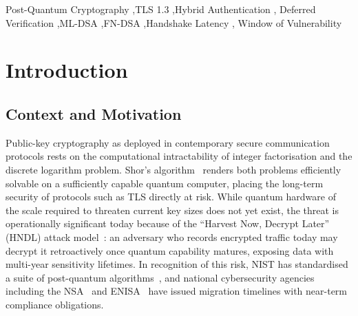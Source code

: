 \documentclass[preprint,10pt,3p]{elsarticle}
\newcommand{\Dt}{\ensuremath{\Delta t}}
\newcommand{\ms}{\,ms}
\begin{document}
\begin{frontmatter}
\begin{abstract}
Four contributions are made.  First, a proof-of-concept implementation is
presented within OpenSSL~3.x using the Open Quantum Safe (OQS) provider,
validated on both Windows~11 and Ubuntu~22.04 with AVX2-optimised PQC
primitives.  Second, controlled experiments across RTT values of 0--150\ms\ and
concurrency levels of 100--1000 clients establish that DAPV reduces
client-perceived handshake latency by a constant offset of approximately 20\ms,
independent of RTT, with server throughput improving by 30--36\% for hybrid
P-256\,+\,ML-DSA-44 at 500 concurrent clients.  Third, decomposition of the
Window of Vulnerability (\Dt) --- the interval between provisional handshake
completion and PQC confirmation --- reveals that the measured 14--21\ms\ window
is dominated by thread scheduling overhead rather than cryptographic
computation, which costs less than 0.15\ms\ on modern AVX2 hardware.  Fourth,
a quantitative risk characterisation provides leakage bounds across link speeds
and CPU load levels, identifies a novel denial-of-service vector specific to
deferred verification, and proposes concrete mitigations including a bounded
thread pool, a data-transmission cap, and a minimal OpenSSL API design for
application-layer policy enforcement.
\end{abstract}

\begin{keyword}
Post-Quantum Cryptography \sep TLS 1.3 \sep Hybrid Authentication \sep
Deferred Verification \sep ML-DSA \sep FN-DSA \sep Handshake Latency \sep
Window of Vulnerability
\end{keyword}
\end{frontmatter}

\section{Introduction}
\label{sec:intro}

\subsection{Context and Motivation}

Public-key cryptography as deployed in contemporary secure communication
protocols rests on the computational intractability of integer factorisation and
the discrete logarithm problem.  Shor's algorithm~\cite{Shor1994} renders both
problems efficiently solvable on a sufficiently capable quantum computer,
placing the long-term security of protocols such as TLS directly at risk.
While quantum hardware of the scale required to threaten current key sizes does
not yet exist, the threat is operationally significant today because of the
``Harvest Now, Decrypt Later'' (HNDL) attack model~\cite{Alnahawi2024}: an
adversary who records encrypted traffic today may decrypt it retroactively once
quantum capability matures, exposing data with multi-year sensitivity lifetimes.
In recognition of this risk, NIST has standardised a suite of post-quantum
algorithms~\cite{FIPS204}, and national cybersecurity agencies including the
NSA~\cite{NSA2022} and ENISA~\cite{ENISA2023} have issued migration timelines
with near-term compliance obligations.
\end{document}
